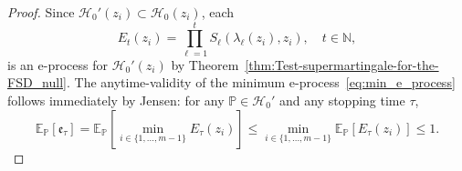 \documentclass[12pt,twoside]{article}
\theoremstyle{plain}
\theoremstyle{definition}
\theoremstyle{remark}
\newcommand{\N}{\mathbb{N}}
\newcommand{\calH}{\mathcal{H}}
\newcommand{\Esymb}{\mathbb{E}}
\newcommand{\Psymb}{\mathbb{P}}
\newcommand{\Ex}[2]{\Esymb_{{#1}}\left[{#2}\right]}
\newcommand{\e}{\mathfrak{e}}
\begin{document}
 \begin{proof}
Since $\calH_0'(z_i) \subset \calH_0(z_i)$, each \begin{equation*}
    E_t(z_i) = \prod_{\ell=1}^t S_{\ell}(\lambda_{\ell}(z_i),z_i), \quad t\in \N,
\end{equation*} 
is an e-process for $\calH_0'(z_i)$ by Theorem~\ref{thm:Test-supermartingale-for-the-FSD_null}. 
The anytime-validity of the minimum e-process~\eqref{eq:min_e_process} follows immediately by Jensen: for any $\Psymb \in \calH_0'$ and any stopping time $\tau$,
\begin{equation*}
    \Ex{\Psymb}{\e_\tau} = \Ex{\Psymb}{\min_{i \in \{1, \dotsc, m-1\}} E_\tau(z_i)} \leq \min_{i \in \{1, \dotsc, m-1\}} \Ex{\Psymb}{E_\tau(z_i)} \leq 1. 
\end{equation*}


\end{proof}
\end{document}
